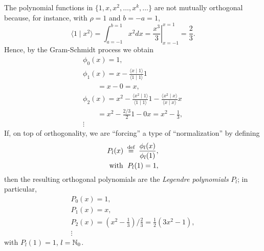 The polynomial functions in $\{1,x,x^2,\ldots ,x^k,\ldots \}$
are not mutually orthogonal because,
for instance,  with $\rho =1$ and $b=-a=1$,
\begin{equation}
\langle   1 \mid x^2\rangle
=
\int_{a=-1}^{b=1} x^2 dx
=
\left. \frac{x^3}{3} \right|_{x=-1}^{x=1}
=
\frac{2}{3}.
\end{equation}
Hence, by the   Gram-Schmidt  process we obtain
\begin{equation}
\begin{split}
\phi_0(x) =1,       \\
\phi_1(x) = x - \frac{\langle x \mid 1 \rangle}{\langle 1   \mid 1 \rangle}1   \\
\qquad  = x - 0 =x,   \\
\phi_2(x) = x^2 - \frac{\langle x^2 \mid 1 \rangle}{\langle 1   \mid 1 \rangle}1
 - \frac{\langle x^2 \mid x \rangle}{\langle x   \mid x \rangle}x
 \\
\qquad  =  x^2 - \frac{2/3}{2}1 -0x    =    x^2 - \frac{1 }{ 3},\\
\vdots
\end{split}
\end{equation}
If, on top of orthogonality,  we are ``forcing'' a type of ``normalization'' by defining
\begin{equation}
\begin{split}
P_l(x)\stackrel{{\tiny \textrm{ def }}}{=}\frac{\phi_l(x)}{\phi_l(1)},
\\
 \textrm{with }\; P_l(1)  =1,
\end{split}
\end{equation}
then the resulting orthogonal polynomials are the
{\em Legendre polynomials}  $P_l$; in particular,
\begin{equation}
\begin{split}
P_0(x) =1,\\
P_1(x) =x,\\
P_2(x) =  \left. \left( x^2 - \frac{1 }{ 3}\right)\bigg/ \frac{2 }{ 3}  \right.
       =  \frac{1 }{ 2} \left( 3x^2 - 1\right)
,\\
\vdots
\end{split}
\label{2011-m-ch-sfelp}
\end{equation}
with $P_l(1)=1$, $l={\Bbb N}_0$.


